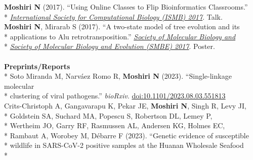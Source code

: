 \documentclass[margin,line]{res}
\begin{document}
\begin{resume}
\hspace*{4mm} \textbf{Moshiri N} (2017). ``Using Online Classes to Flip Bioinformatics Classrooms.''\\*\vspace{2mm}
\hspace*{8mm} \href{https://www.iscb.org/cms_addon/conferences/ismbeccb2017/technologytrack.php}{\textit{International Society for Computational Biology (ISMB) 2017}}. Talk.\\
\hspace*{4mm} \textbf{Moshiri N}, Mirarab S (2017). ``A two-state model of tree evolution and its\\*
\hspace*{9mm} applications to Alu retrotransposition.'' \href{https://smbe.org/smbe/}{\textit{Society of Molecular Biology and}}\\*\vspace{2mm}
\hspace*{8mm} \href{https://smbe.org/smbe/}{\textit{Society of Molecular Biology and Evolution (SMBE) 2017}}. Poster.\\
~\\
\textbf{Preprints/Reports}\vspace{2mm}\\*
\hspace*{4mm} Soto Miranda M, Narv\'{a}ez Romo R, \textbf{Moshiri N} (2023). ``Single-linkage molecular\\*\vspace{2mm}
\hspace*{8mm} clustering of viral pathogens.'' \textit{bioRxiv}. \href{https://doi.org/10.1101/2023.08.03.551813}{doi:10.1101/2023.08.03.551813}\\
\hspace*{4mm} Crits-Christoph A, Gangavarapu K, Pekar JE, \textbf{Moshiri N}, Singh R, Levy JI,\\*
\hspace*{9mm} Goldstein SA, Suchard MA, Popescu S, Robertson DL, Lemey P,\\*
\hspace*{9mm} Wertheim JO, Garry RF, Rasmussen AL, Andersen KG, Holmes EC,\\*
\hspace*{9mm} Rambaut A, Worobey M, D\'ebarre F (2023). ``Genetic evidence of susceptible\\*
\hspace*{9mm} wildlife in SARS-CoV-2 positive samples at the Huanan Wholesale Seafood\\*

\end{resume}
\end{document}
